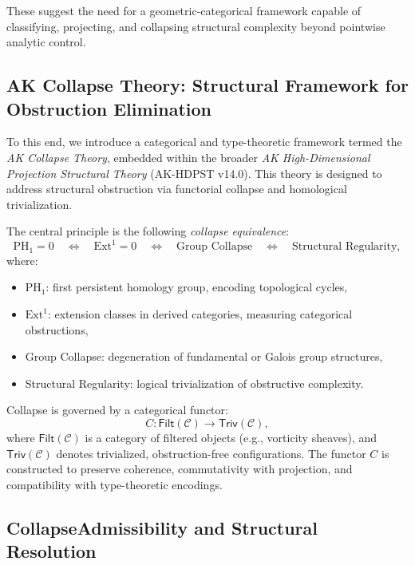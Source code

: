 \documentclass[11pt]{article}
\begin{document}
These suggest the need for a geometric-categorical framework capable of classifying, projecting, and collapsing structural complexity beyond pointwise analytic control.

\subsection{AK Collapse Theory: Structural Framework for Obstruction Elimination}

To this end, we introduce a categorical and type-theoretic framework termed the \emph{AK Collapse Theory}, embedded within the broader \emph{AK High-Dimensional Projection Structural Theory} (AK-HDPST v14.0). This theory is designed to address structural obstruction via functorial collapse and homological trivialization.

The central principle is the following \emph{collapse equivalence}:
\begin{equation}
\mathrm{PH}_1 = 0 \quad \Longleftrightarrow \quad \mathrm{Ext}^1 = 0 \quad \Longleftrightarrow \quad \text{Group Collapse} \quad \Longleftrightarrow \quad \text{Structural Regularity},
\end{equation}
where:
\begin{itemize}
  \item \( \mathrm{PH}_1 \): first persistent homology group, encoding topological cycles,
  \item \( \mathrm{Ext}^1 \): extension classes in derived categories, measuring categorical obstructions,
  \item Group Collapse: degeneration of fundamental or Galois group structures,
  \item Structural Regularity: logical trivialization of obstructive complexity.
\end{itemize}

Collapse is governed by a categorical functor:
\[
C : \mathsf{Filt}(\mathcal{C}) \longrightarrow \mathsf{Triv}(\mathcal{C}),
\]
where \( \mathsf{Filt}(\mathcal{C}) \) is a category of filtered objects (e.g., vorticity sheaves), and \( \mathsf{Triv}(\mathcal{C}) \) denotes trivialized, obstruction-free configurations. The functor \( C \) is constructed to preserve coherence, commutativity with projection, and compatibility with type-theoretic encodings.

\subsection{CollapseAdmissibility and Structural Resolution}
\end{document}
